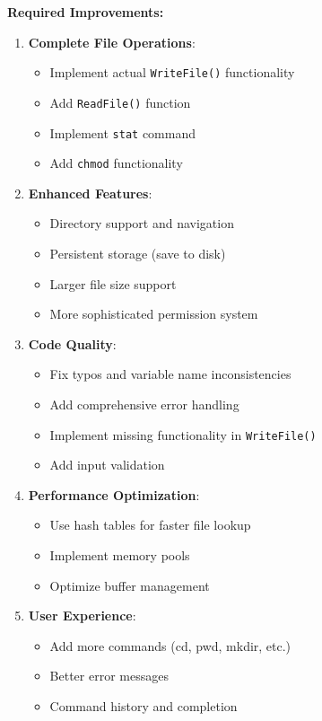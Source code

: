 \documentclass[11pt,a4paper]{article}
\begin{document}
\textbf{Required Improvements:}
\begin{enumerate}
    \item \textbf{Complete File Operations}: 
    \begin{itemize}
        \item Implement actual \texttt{WriteFile()} functionality
        \item Add \texttt{ReadFile()} function
        \item Implement \texttt{stat} command
        \item Add \texttt{chmod} functionality
    \end{itemize}
    
    \item \textbf{Enhanced Features}:
    \begin{itemize}
        \item Directory support and navigation
        \item Persistent storage (save to disk)
        \item Larger file size support
        \item More sophisticated permission system
    \end{itemize}
    
    \item \textbf{Code Quality}:
    \begin{itemize}
        \item Fix typos and variable name inconsistencies
        \item Add comprehensive error handling
        \item Implement missing functionality in \texttt{WriteFile()}
        \item Add input validation
    \end{itemize}
    
    \item \textbf{Performance Optimization}:
    \begin{itemize}
        \item Use hash tables for faster file lookup
        \item Implement memory pools
        \item Optimize buffer management
    \end{itemize}
    
    \item \textbf{User Experience}:
    \begin{itemize}
        \item Add more commands (cd, pwd, mkdir, etc.)
        \item Better error messages
        \item Command history and completion
    \end{itemize}
\end{enumerate}
\end{document}
